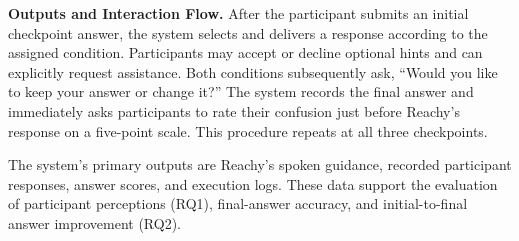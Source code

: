 \documentclass[conference]{IEEEtran}
\begin{document}
\noindent\textbf{Outputs and Interaction Flow.}
After the participant submits an initial checkpoint answer, the system selects and delivers a response according to the assigned condition. Participants may accept or decline optional hints and can explicitly request assistance. Both conditions subsequently ask, ``Would you like to keep your answer or change it?'' The system records the final answer and immediately asks participants to rate their confusion just before Reachy's response on a five-point scale. This procedure repeats at all three checkpoints.

The system's primary outputs are Reachy's spoken guidance, recorded participant responses, answer scores, and execution logs. These data support the evaluation of participant perceptions (RQ1), final-answer accuracy, and initial-to-final answer improvement (RQ2).
\end{document}
